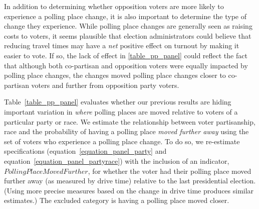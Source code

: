 \documentclass[12pt]{article}
\begin{document}
In addition to determining whether opposition voters are more likely to experience a polling place change, it is also important to determine the type of change they experience.  While polling place changes are generally seen as raising costs to voters, it seems plausible that election administrators could believe that reducing travel times may have a \emph{net} positive effect on turnout by making it easier to vote. If so, the lack of effect in \ref{table_pp_panel} could reflect the fact that although both co-partisan and opposition voters were equally impacted by polling place changes, the changes moved polling place changes closer to co-partisan voters and further from opposition party voters.

Table~\ref{table_pp_panel} evaluates whether our previous results are hiding important variation in \emph{where} polling places are moved relative to voters of a particular party or race.  We estimate the relationship between voter partisanship, race and the probability of having a polling place \emph{moved further away} using the set of voters who experience a polling place change.  To do so, we re-estimate specifications (equation~\ref{equation_panel_party} and equation~\ref{equation_panel_partyrace}) with the inclusion of an indicator, $PollingPlaceMovedFurther$, for whether the voter had their polling place moved further away (as measured by drive time) relative to the last presidential election.  (Using more precise measures based on the change in drive time produces similar estimates.) The excluded category is having a polling place moved closer.
\end{document}
